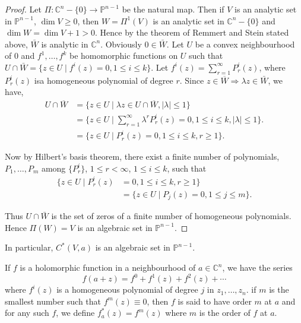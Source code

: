 \begin{proof} %
 Let $\Pi : \mathbb{C}^n - \{0\} \to \mathbb{P}^{n-1}$ be
  the natural map. Then if $V$ is an analytic set in $\mathbb{P}^{n-1}$,
  $\dim  V\geq 0$, then $W = \Pi^{1}(V)$ is an analytic set in 
$\mathbb{C}^n -\{0\}$ and $\dim W = \dim V+1>0$. Hence by the theorem
  of Remmert and Stein stated above, $\bar{W}$ is analytic in $\mathbb{C}^n$. 
  Obviously $0 \in \bar{W}$. Let $U$ be a convex neighbourhood of
  $0$ and $f^{1},\ldots, f^{k}$ be homomorphic functions on $U$ such
  that $U \cap \bar{W} = \{z \in U \mid f^{i}(z) = 0, 1 \leq i
  \leq k\}$. Let $f^{i}(z) = \sum^{\infty}_{r=1}
  P^{i}_{r}(z)$, where $P^{i}_{r}(z)$ is\pageoriginale a homogeneous
  polynomial of 
  degree $r$. Since $z \in \overline{W}\Rightarrow \lambda z \in
  \bar{W}$, we have, 
  \begin{align*}
    U \cap \overline{W} &= \bigg \{z \in U \mid \lambda z \in U \cap
    \overline{W}, \mid \lambda \mid \leq 1 \bigg \}\\ 
    &= \bigg\{z \in U \mid \sum^{\infty}_{r=1}
    \lambda^{r} P^{i}_{r}(z) =0, 1 \leq i \leq k, |\lambda| \leq 1
    \bigg\}.\\ 
    &= \bigg \{ z \in U \mid P^{i}_{r}(z) = 0, 1 \leq i \leq k, r
    \geq 1 \bigg\}. 
  \end{align*}

Now by Hilbert's basis theorem, there exist a finite number of
polynomials, $P_{1}, \ldots , P_{m}$ among $\bigg\{P^{i}_{r} \bigg\}$,
$1 \leq r < \infty$, $1 \leq i \leq k$, such that  
\begin{align*}
  \bigg\{ z \in U \mid P^{i}_{r}(z) &= 0, 1\leq i \leq k, r \geq 1 \bigg\}\\
  &= \bigg\{z \in U \mid P_{j}(z) = 0, 1 \leq j \leq m\bigg\}.
\end{align*}

Thus $U \cap \bar{W}$ is the set of zeros of a finite number of
homogeneous polynomials. Hence $\Pi (W) = V$ is an algebraic set in
$\mathbb{P}^{n-1}$. 
\end{proof}

\begin{coro*} %
In particular, $C^{\ast}(V,a)$ is an algebraic set in $\mathbb{P}^{n-1}$.
\end{coro*}

\setcounter{definition}{6}
\begin{definition}\label{chap3-defin7}
  If $f$ is a holomorphic function in a neighbourhood of $a  \in
  \mathbb{C}^n$, we have the series 
  $$
  f(a+z) = f^{0} + f^{1}(z) + f^{2}(z) + \cdots
  $$
  where $f^{i}(z)$ is a homogeneous polynomial of degree $j$ in
  $z_{1},\ldots,z_{n}$. if $m$ is the smallest number such that 
  $f^{m}(z) \equiv 0$, then $f$ is said to have order $m$ at $a$ and for
  any such $f$, we define $f^{\ast}_{a}(z) = f^{m}(z)$ where $m$ is
  the order of $f$ at $a$. 
\end{definition}

